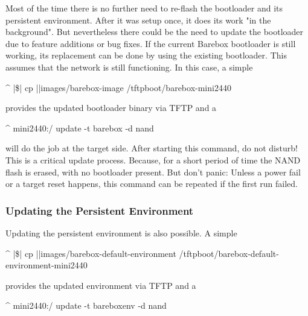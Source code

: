 Most of the time there is no further need to re-flash the bootloader and its
persistent environment. After it was setup once, it does its work "in the
background". But nevertheless there could be the need to update the bootloader
due to feature additions or bug fixes. If the current Barebox bootloader is
still working, its replacement can be done by using the existing bootloader.
This assumes that the network is still functioning. In this case, a simple

\begin{ptxshell}[escapechar=|]{^}
|\$| cp |\ptxdistPlatformDir |images/barebox-image /tftpboot/barebox-mini2440
\end{ptxshell}

provides the updated bootloader binary via TFTP and a

\begin{ptxshell}[escapechar=|]{^}
mini2440:/ update -t barebox -d nand
\end{ptxshell}

will do the job at the target side. After starting this command, do not disturb!
This is a critical update process. Because, for a short period of time the
NAND flash is erased, with no bootloader present. But don't panic: Unless a
power fail or a target reset happens, this command can be repeated if the
first run failed.

\subsubsection{Updating the Persistent Environment}


Updating the persistent environment is also possible. A simple

\begin{ptxshell}[escapechar=|]{^}
|\$| cp |\ptxdistPlatformDir |images/barebox-default-environment /tftpboot/barebox-default-environment-mini2440
\end{ptxshell}

provides the updated environment via TFTP and a

\begin{ptxshell}[escapechar=|]{^}
mini2440:/ update -t bareboxenv -d nand
\end{ptxshell}

